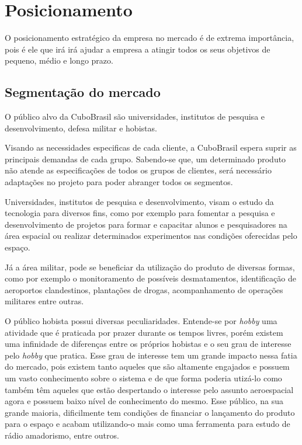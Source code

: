 \documentclass[
	12pt,				%
	openright,			%
	oneside,			%
	a4paper,			%
	english,			%
	french,				%
	spanish,			%
	brazil				%
	]{abntex2}
\begin{document}
\section[Posicionamento]{Posicionamento}	

	O posicionamento estratégico da empresa no mercado é de extrema importância, pois é ele que irá irá ajudar a empresa a atingir todos os seus objetivos de pequeno, médio e longo prazo.

\subsection[Segmentação do mercado]{Segmentação do mercado}

	O público alvo da CuboBrasil são universidades, institutos de pesquisa e desenvolvimento, defesa militar e hobistas.
	
	Visando as necessidades especificas de cada cliente, a CuboBrasil espera suprir as principais demandas de cada grupo. Sabendo-se que, um determinado produto não atende as especificações de todos os grupos de clientes, será necessário adaptações no projeto para poder abranger todos os segmentos.
	
	Universidades, institutos de pesquisa e desenvolvimento, visam o estudo da tecnologia para diversos fins, como por exemplo para fomentar a pesquisa e desenvolvimento de projetos para formar e capacitar alunos e pesquisadores na área espacial ou realizar determinados experimentos nas condições oferecidas pelo espaço.
	
	Já a área militar, pode se beneficiar da utilização do produto de diversas formas, como por exemplo o monitoramento de possíveis desmatamentos, identificação de aeroportos clandestinos, plantações de drogas, acompanhamento de operações militares entre outras.
	
	O público hobista possui diversas peculiaridades. Entende-se por \textit{hobby} uma atividade que é praticada por prazer durante os tempos livres, porém existem uma infinidade de diferenças entre os próprios hobistas e o seu grau de interesse pelo \textit{hobby} que pratica. Esse grau de interesse tem um grande impacto nessa fatia do mercado, pois existem tanto aqueles que são altamente engajados e possuem um vasto conhecimento sobre o sistema e de que forma poderia utizá-lo como também têm aqueles que estão despertando o interesse pelo assunto aeroespacial agora e possuem baixo nível de conhecimento do mesmo. Esse público, na sua grande maioria, dificilmente tem condições de financiar o lançamento do produto para o espaço e acabam utilizando-o mais como uma ferramenta para estudo de rádio amadorismo, entre outros.
	
\end{document}
